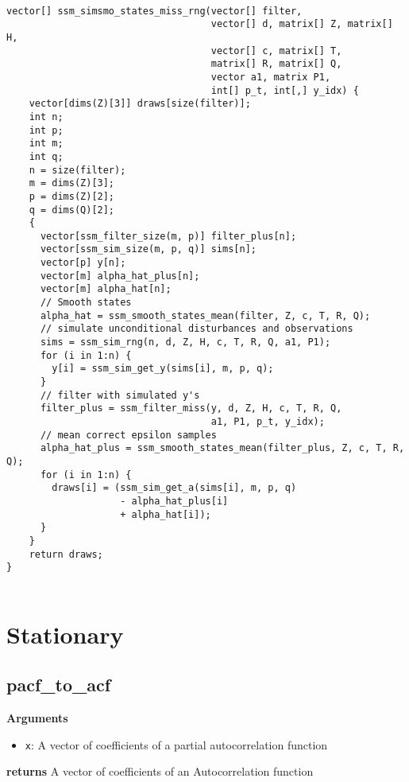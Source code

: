 \documentclass[]{book}
\providecommand{\tightlist}{%
  \setlength{\itemsep}{0pt}\setlength{\parskip}{0pt}}
\begin{document}
\begin{verbatim}

vector[] ssm_simsmo_states_miss_rng(vector[] filter,
                                    vector[] d, matrix[] Z, matrix[] H,
                                    vector[] c, matrix[] T,
                                    matrix[] R, matrix[] Q,
                                    vector a1, matrix P1,
                                    int[] p_t, int[,] y_idx) {
    vector[dims(Z)[3]] draws[size(filter)];
    int n;
    int p;
    int m;
    int q;
    n = size(filter);
    m = dims(Z)[3];
    p = dims(Z)[2];
    q = dims(Q)[2];
    {
      vector[ssm_filter_size(m, p)] filter_plus[n];
      vector[ssm_sim_size(m, p, q)] sims[n];
      vector[p] y[n];
      vector[m] alpha_hat_plus[n];
      vector[m] alpha_hat[n];
      // Smooth states
      alpha_hat = ssm_smooth_states_mean(filter, Z, c, T, R, Q);
      // simulate unconditional disturbances and observations
      sims = ssm_sim_rng(n, d, Z, H, c, T, R, Q, a1, P1);
      for (i in 1:n) {
        y[i] = ssm_sim_get_y(sims[i], m, p, q);
      }
      // filter with simulated y's
      filter_plus = ssm_filter_miss(y, d, Z, H, c, T, R, Q,
                                    a1, P1, p_t, y_idx);
      // mean correct epsilon samples
      alpha_hat_plus = ssm_smooth_states_mean(filter_plus, Z, c, T, R, Q);
      for (i in 1:n) {
        draws[i] = (ssm_sim_get_a(sims[i], m, p, q)
                    - alpha_hat_plus[i]
                    + alpha_hat[i]);
      }
    }
    return draws;
}


\end{verbatim}

\section{Stationary}\label{stationary}

\subsection{pacf\_to\_acf}\label{pacf_to_acf}

\textbf{Arguments}

\begin{itemize}
\tightlist
\item
  \texttt{x}: A vector of coefficients of a partial autocorrelation
  function
\end{itemize}

\textbf{returns} A vector of coefficients of an Autocorrelation function
\end{document}
